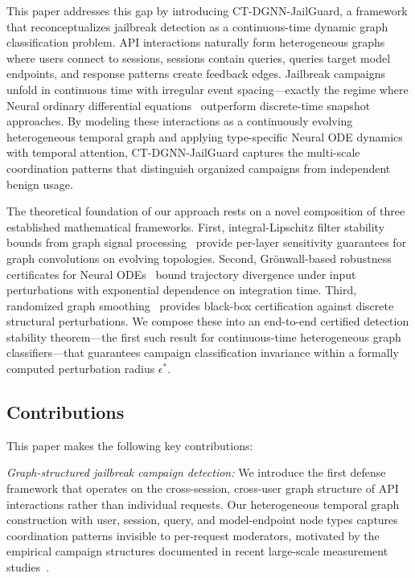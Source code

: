 \documentclass[journal]{IEEEtran}
\theoremstyle{plain}
\theoremstyle{definition}
\theoremstyle{remark}
\begin{document}
This paper addresses this gap by introducing CT-DGNN-JailGuard, a framework that reconceptualizes jailbreak detection as a continuous-time dynamic graph classification problem. API interactions naturally form heterogeneous graphs where users connect to sessions, sessions contain queries, queries target model endpoints, and response patterns create feedback edges. Jailbreak campaigns unfold in continuous time with irregular event spacing---exactly the regime where Neural ordinary differential equations~\cite{chen2018neuralode} outperform discrete-time snapshot approaches. By modeling these interactions as a continuously evolving heterogeneous temporal graph and applying type-specific Neural ODE dynamics with temporal attention, CT-DGNN-JailGuard captures the multi-scale coordination patterns that distinguish organized campaigns from independent benign usage.

The theoretical foundation of our approach rests on a novel composition of three established mathematical frameworks. First, integral-Lipschitz filter stability bounds from graph signal processing~\cite{gama2020stability} provide per-layer sensitivity guarantees for graph convolutions on evolving topologies. Second, Gr\"onwall-based robustness certificates for Neural ODEs~\cite{yan2020robustode} bound trajectory divergence under input perturbations with exponential dependence on integration time. Third, randomized graph smoothing~\cite{wang2021certifiedgraph} provides black-box certification against discrete structural perturbations. We compose these into an end-to-end certified detection stability theorem---the first such result for continuous-time heterogeneous graph classifiers---that guarantees campaign classification invariance within a formally computed perturbation radius $\epsilon^*$.

\subsection{Contributions}

This paper makes the following key contributions:

\textit{Graph-structured jailbreak campaign detection:} We introduce the first defense framework that operates on the cross-session, cross-user graph structure of API interactions rather than individual requests. Our heterogeneous temporal graph construction with user, session, query, and model-endpoint node types captures coordination patterns invisible to per-request moderators, motivated by the empirical campaign structures documented in recent large-scale measurement studies~\cite{shen2024dan}.
\end{document}
